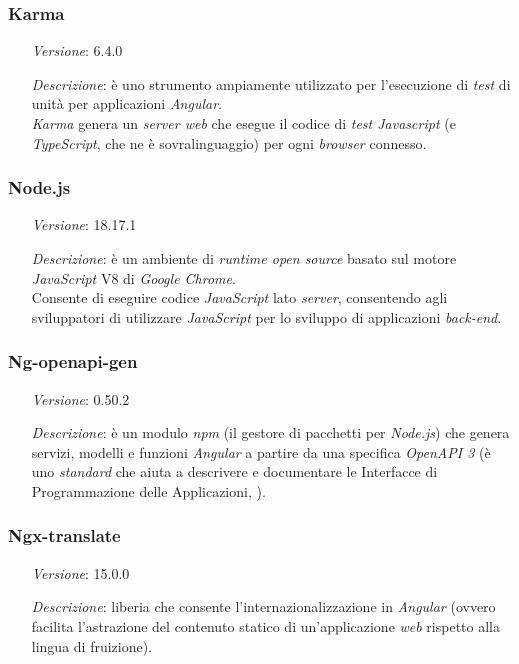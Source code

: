     \subsubsection*{Karma}
    \begin{itemize}
        \item [\textit{Versione}:] 6.4.0
        \item [\textit{Descrizione}:] è uno strumento ampiamente utilizzato per l'esecuzione di \textit{test} di unità per applicazioni \textit{Angular}. \\
                    \textit{Karma} genera un \textit{server web} che esegue il codice di \textit{test Javascript} (e \textit{TypeScript}, che ne è sovralinguaggio) per ogni \textit{browser} connesso.
    \end{itemize}

    \subsubsection*{Node.js}
    \begin{itemize}
        \item [\textit{Versione}:] 18.17.1
        \item [\textit{Descrizione}:] è un ambiente di \textit{runtime open source} basato sul motore \textit{JavaScript} V8 di \textit{Google Chrome}. \\
                    Consente di eseguire codice \textit{JavaScript} lato \textit{server}, consentendo agli sviluppatori di utilizzare \textit{JavaScript} per lo sviluppo di applicazioni \textit{back-end}.
    \end{itemize}

    \subsubsection*{Ng-openapi-gen}
    \begin{itemize}
        \item [\textit{Versione}:] 0.50.2
        \item [\textit{Descrizione}:] è un modulo \textit{npm} (il gestore di pacchetti per \textit{Node.js}) che genera servizi, 
                    modelli e funzioni \textit{Angular} a partire da una specifica \textit{OpenAPI 3} (è uno \textit{standard} che aiuta a descrivere e documentare le Interfacce di Programmazione delle Applicazioni, ).
    \end{itemize}

    \subsubsection*{Ngx-translate}
    \begin{itemize}
        \item [\textit{Versione}:] 15.0.0
        \item [\textit{Descrizione}:] liberia che consente l'internazionalizzazione in \textit{Angular} (ovvero facilita l'astrazione del contenuto statico di un'applicazione \textit{web} rispetto alla lingua di fruizione).
    \end{itemize}


